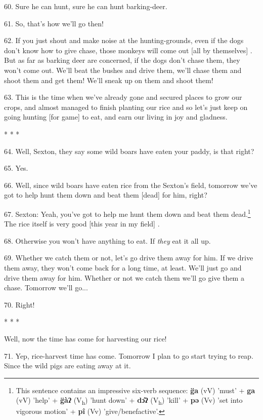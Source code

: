 60. Sure he can hunt, sure he can hunt barking-deer.

61. So, that's how we'll go then!

62. If you just shout and make noise at the hunting-grounds, even if the dogs don't
know how to give chase, those monkeys will come out [all by themselves] . But as
far as barking deer are concerned, if the dogs don't chase them, they won't come
out. We'll beat the bushes and drive them, we'll chase them and shoot them and
get them! We'll sneak up on them and shoot them!

63. This is the time when we've already gone and secured places to grow our crops,
and almost managed to finish planting our rice and so let's just keep on going
hunting [for game] to eat, and earn our living in joy and gladness.

\begin{center}
* * *
\end{center}

64. Well, Sexton, they say some wild boars have eaten your paddy, is that right?

65. Yes.

66. Well, since wild boars have eaten rice from the Sexton's field, tomorrow we've
got to help hunt them down and beat them [dead] for him, right?

67. Sexton: Yeah, you've got to help me hunt them down and beat them dead.\footnote{This sentence contains an impressive six-verb sequence: \textbf{g̈a} (vV) 'must' + \textbf{ga} (vV) 'help' + \textbf{g̈àʔ} (V\textsubscript{h}) 'hunt down' + \textbf{dɔ̂ʔ} (V\textsubscript{h}) 'kill' + \textbf{pə} (Vv) 'set into vigorous motion' + \textbf{pî} (Vv) 'give/benefactive'.}
The rice itself is very good [this year in my field] .

68. Otherwise you won't have anything to eat. If \textit{they} eat it all up.

69. Whether we catch them or not, let's go drive them away for him. If we drive
them away, they won't come back for a long time, at least. We'll just go and drive
them away for him. Whether or not we catch them we'll go give them a chase. Tomorrow
we'll go...

70. Right!

\begin{center}
* * *
\end{center}

Well, now the time has come for harvesting our rice!

71. Yep, rice-harvest time has come. Tomorrow I plan to go start trying to reap.
Since the wild pigs are eating away at it.

